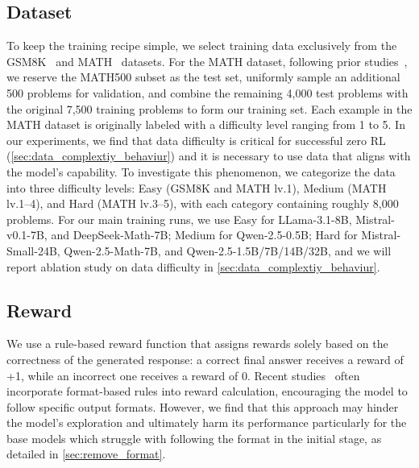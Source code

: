 \subsection{Dataset}
To keep the training recipe simple, we select training data exclusively from the GSM8K~\citep{cobbe2021training} and MATH~\citep{hendrycks2021measuring} datasets. 
For the MATH dataset, following prior studies~\citep{lightman2023let, wang2023math, sun2024easy}, we reserve the MATH500 subset as the test set, uniformly sample an additional 500 problems for validation, and combine the remaining 4,000 test problems with the original 7,500 training problems to form our training set. Each example in the MATH dataset is originally labeled with a difficulty level ranging from 1 to 5. In our experiments, we find that data difficulty is critical for successful zero RL (\textsection\ref{sec:data_complextiy_behaviur}) and it is necessary to use data that aligns with the model's capability. To investigate this phenomenon, we categorize the data into three difficulty levels: Easy (GSM8K and MATH lv.1), Medium (MATH lv.1–4), and Hard (MATH lv.3–5), with each category containing roughly 8,000 problems. 
For our main training runs, we use Easy for LLama-3.1-8B, Mistral- v0.1-7B, and DeepSeek-Math-7B; Medium for Qwen-2.5-0.5B; Hard for Mistral-Small-24B, Qwen-2.5-Math-7B, and Qwen-2.5-1.5B/7B/14B/32B, and we will report ablation study on data difficulty in \textsection\ref{sec:data_complextiy_behaviur}. 



\subsection{Reward} 
We use a rule-based reward function that assigns rewards solely based on the correctness of the generated response: a correct final answer receives a reward of +1, while an incorrect one receives a reward of 0. Recent studies~\citep{deepscaler2025,chen2025empirical} often incorporate format-based rules into reward calculation, encouraging the model to follow specific output formats. However, we find that this approach may hinder the model's exploration and ultimately harm its performance particularly for the base models which struggle with following the format in the initial stage, as detailed in \textsection\ref{sec:remove_format}.


